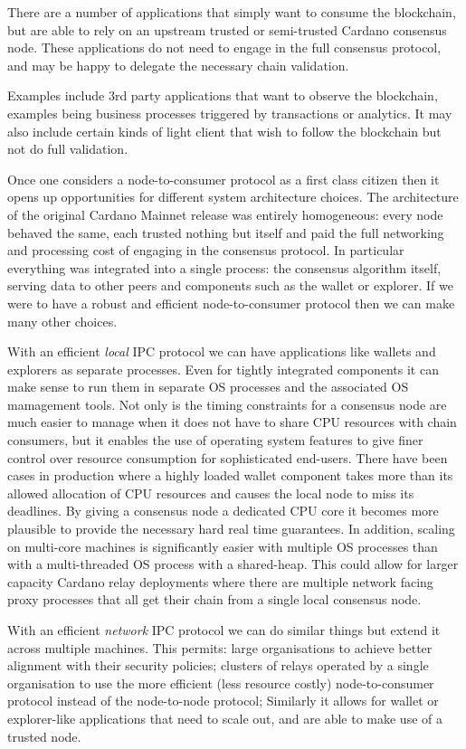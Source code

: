 \documentclass{report}
\theoremstyle{definition}{
  \newtheorem{lemma}{Lemma}[section] %
  \newtheorem{definition}[lemma]{Definition}
}
\theoremstyle{theorem}{
  \newtheorem{invariant}[lemma]{Invariant}
  \newtheorem{proofobligation}[lemma]{Proof Obligation}
}
\numberwithin{equation}{lemma}
\begin{document}
There are a number of applications that simply want to consume the blockchain,
but are able to rely on an upstream trusted or semi-trusted Cardano consensus
node. These applications do not need to engage in the full consensus protocol,
and may be happy to delegate the necessary chain validation.

Examples include 3rd party applications that want to observe the blockchain,
examples being business processes triggered by transactions or analytics.  It
may also include certain kinds of light client that wish to follow the
blockchain but not do full validation.

Once one considers a node-to-consumer protocol as a first class citizen then it
opens up opportunities for different system architecture choices.
The architecture of the original Cardano Mainnet release was entirely homogeneous:
every node behaved the same, each trusted nothing but itself and paid the full
networking and processing cost of engaging in the consensus protocol.  In
particular everything was integrated into a single process: the consensus
algorithm itself, serving data to other peers and components such as the wallet
or explorer. If we were to have a robust and efficient node-to-consumer protocol
then we can make many other choices.

With an efficient \emph{local} IPC protocol we can have applications
like wallets and explorers as separate processes. Even for tightly
integrated components it can make sense to run them in separate OS
processes and the associated OS mamagement tools. Not only is the
timing constraints for a consensus node are much easier to manage when
it does not have to share CPU resources with chain consumers, but it
enables the use of operating system features to give finer control
over resource consumption for sophisticated end-users.  There have
been cases in production where a highly loaded wallet component takes
more than its allowed allocation of CPU resources and causes the local
node to miss its deadlines.  By giving a consensus node a dedicated
CPU core it becomes more plausible to provide the necessary hard real
time guarantees. In addition, scaling on multi-core machines is
significantly easier with multiple OS processes than with a
multi-threaded OS process with a shared-heap. This could allow for
larger capacity Cardano relay deployments where there are multiple
network facing proxy processes that all get their chain from a single
local consensus node.

With an efficient \emph{network} IPC protocol we can do similar things
but extend it across multiple machines. This permits: large
organisations to achieve better alignment with their security
policies; clusters of relays operated by a single organisation to use
the more efficient (less resource costly) node-to-consumer protocol
instead of the node-to-node protocol; Similarly it allows for wallet
or explorer-like applications that need to scale out, and are able to
make use of a trusted node.
\end{document}
